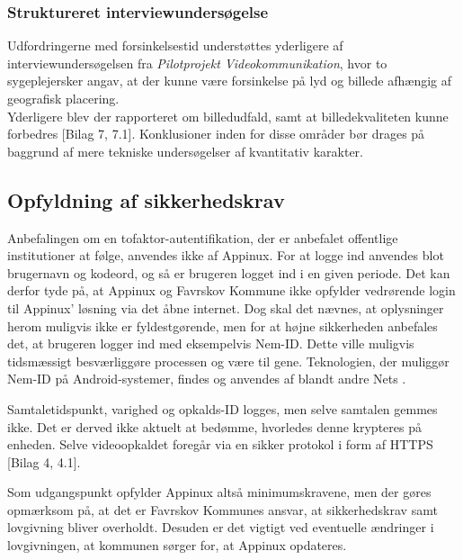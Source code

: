 \subsubsection{Struktureret interviewundersøgelse}
Udfordringerne med forsinkelsestid understøttes yderligere af interviewundersøgelsen fra \textit{Pilotprojekt Videokommunikation}, hvor to sygeplejersker angav, at der kunne være forsinkelse på lyd og billede afhængig af geografisk placering. \\Yderligere blev der rapporteret om billedudfald, samt at billedekvaliteten kunne forbedres [Bilag 7, 7.1]. Konklusioner inden for disse områder bør drages på baggrund af mere tekniske undersøgelser af kvantitativ karakter.

\subsection{Opfyldning af sikkerhedskrav}
Anbefalingen om en tofaktor-autentifikation, der er anbefalet offentlige institutioner at følge, anvendes ikke af Appinux. For at logge ind anvendes blot brugernavn og kodeord, og så er brugeren logget ind i en given periode. Det kan derfor tyde på, at Appinux og Favrskov Kommune ikke opfylder  vedrørende login til Appinux' løsning via det åbne internet. Dog skal det nævnes, at oplysninger herom muligvis ikke er fyldestgørende, men for at højne sikkerheden anbefales det, at brugeren logger ind med eksempelvis Nem-ID. Dette ville muligvis tidsmæssigt besværliggøre processen og være til gene. Teknologien, der muliggør Nem-ID på Android-systemer, findes og anvendes af blandt andre Nets \cite{netsapp}.

Samtaletidspunkt, varighed og opkalds-ID logges, men selve samtalen gemmes ikke. Det er derved ikke aktuelt at bedømme, hvorledes denne krypteres på enheden. Selve videoopkaldet foregår via en sikker protokol i form af HTTPS [Bilag 4, 4.1].

Som udgangspunkt opfylder Appinux altså minimumskravene, men der gøres opmærksom på, at det er Favrskov Kommunes ansvar, at sikkerhedskrav samt lovgivning bliver overholdt. Desuden er det vigtigt ved eventuelle ændringer i lovgivningen, at kommunen sørger for, at Appinux opdateres.

